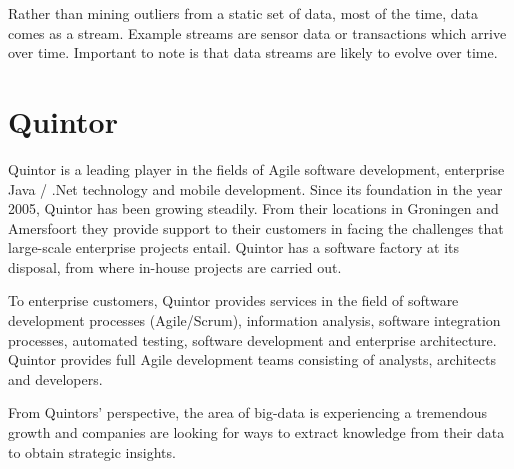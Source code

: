 Rather than mining outliers from a static set of data, most of the time, data comes as a stream. Example streams are sensor data or transactions which arrive over time. Important to note is that data streams are likely to evolve over time.

\section{Quintor \label{sec1-Quintor}}
Quintor is a leading player in the fields of Agile software development, enterprise Java / .Net technology and mobile development. Since its foundation in the year 2005, Quintor has been growing steadily. From their locations in Groningen and Amersfoort they provide support to their customers in facing the challenges that large-scale enterprise projects entail. Quintor has a software factory at its disposal, from where in-house projects are carried out. 

To enterprise customers, Quintor provides services in the field of software development processes (Agile/Scrum), information analysis, software integration processes, automated testing, software development and enterprise architecture. Quintor provides full Agile development teams consisting of analysts, architects and developers.

From Quintors' perspective, the area of big-data is experiencing a tremendous growth and companies are looking for ways to extract knowledge from their data to obtain strategic insights.
